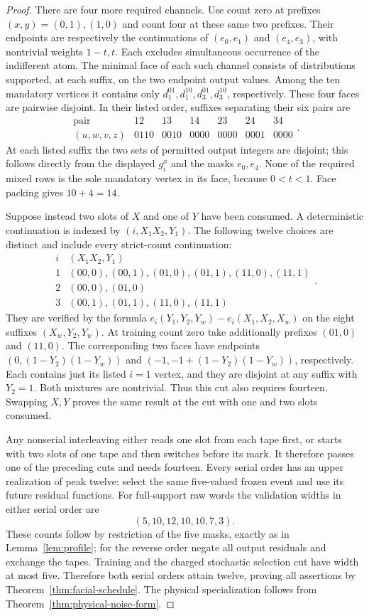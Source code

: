 \begin{proof}
There are four more required channels. Use count zero at prefixes
$(x,y)=(0,1),(1,0)$ and count four at these same two prefixes. Their
endpoints are respectively the continuations of $(e_0,e_1)$ and
$(e_4,e_3)$, with nontrivial weights $1-t,t$. Each excludes simultaneous
occurrence of the indifferent atom. The minimal face of each such
channel consists of distributions supported, at each suffix, on the
two endpoint output values. Among the ten mandatory vertices it contains
only $d_1^{01},d_1^{10},d_3^{01},d_3^{10}$, respectively.
These four faces are pairwise disjoint. In their listed order, suffixes
separating their six pairs are
\[
 \begin{array}{c|rrrrrr}
 \text{pair}&12&13&14&23&24&34\\\hline
 (u,w,v,z)&0110&0010&0000&0000&0001&0000
 \end{array}.
\]
At each listed suffix the two sets of permitted output integers are
disjoint; this follows directly from the displayed $g_i^x$ and the
masks $e_0,e_4$. None of the required mixed rows is the sole mandatory
vertex in its face, because $0<t<1$. Face packing gives $10+4=14$.

Suppose instead two slots of $X$ and one of $Y$ have been consumed.
A deterministic continuation is indexed by $(i,X_1X_2,Y_1)$.
The following twelve choices are distinct and include every strict-count
continuation:
\[
 \begin{array}{c|l}
 i& (X_1X_2,Y_1)\\\hline
 1&(00,0),(00,1),(01,0),(01,1),(11,0),(11,1)\\
 2&(00,0),(01,0)\\
 3&(00,1),(01,1),(11,0),(11,1)
 \end{array}.
\]
They are verified by the formula
$e_i(Y_1,Y_2,Y_w)-e_i(X_1,X_2,X_w)$ on the eight suffixes
$(X_w,Y_2,Y_w)$. At training count zero take additionally prefixes
$(01,0)$ and $(11,0)$. The corresponding two faces have endpoints
$(0,(1-Y_2)(1-Y_w))$ and
$(-1,-1+(1-Y_2)(1-Y_w))$, respectively. Each contains just its listed
$i=1$ vertex, and they are disjoint at any suffix with $Y_2=1$.
Both mixtures are nontrivial. Thus this cut also requires fourteen.
Swapping $X,Y$ proves the same result at the cut with one and two
slots consumed.

Any nonserial interleaving either reads one slot from each tape first,
or starts with two slots of one tape and then switches before its mark.
It therefore passes one of the preceding cuts and needs fourteen.
Every serial order has an upper realization of peak twelve: select the
same five-valued frozen event and use its future residual functions.
For full-support raw words the validation widths in either serial order
are
\[
                         (5,10,12,10,10,7,3).
\]
These counts follow by restriction of the five masks, exactly as in
Lemma~\ref{lem:profile}; for the reverse order negate all output
residuals and exchange the tapes. Training and the charged stochastic
selection cut have width at most five. Therefore both serial orders
attain twelve, proving all assertions by
Theorem~\ref{thm:facial-schedule}. The physical specialization follows
from Theorem~\ref{thm:physical-noise-form}.
\end{proof}


